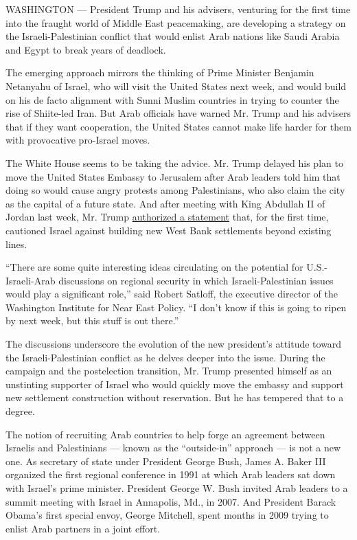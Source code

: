 WASHINGTON --- President Trump and his advisers, venturing for the first
time into the fraught world of Middle East peacemaking, are developing a
strategy on the Israeli-Palestinian conflict that would enlist Arab
nations like Saudi Arabia and Egypt to break years of deadlock.

The emerging approach mirrors the thinking of Prime Minister Benjamin
Netanyahu of Israel, who will visit the United States next week, and
would build on his de facto alignment with Sunni Muslim countries in
trying to counter the rise of Shiite-led Iran. But Arab officials have
warned Mr. Trump and his advisers that if they want cooperation, the
United States cannot make life harder for them with provocative
pro-Israel moves.

The White House seems to be taking the advice. Mr. Trump delayed his
plan to move the United States Embassy to Jerusalem after Arab leaders
told him that doing so would cause angry protests among Palestinians,
who also claim the city as the capital of a future state. And after
meeting with King Abdullah II of Jordan last week, Mr. Trump
\href{https://www.nytimes3xbfgragh.onion/2017/02/02/world/middleeast/iran-missile-test-trump.html}{authorized
a statement} that, for the first time, cautioned Israel against building
new West Bank settlements beyond existing lines.

``There are some quite interesting ideas circulating on the potential
for U.S.-Israeli-Arab discussions on regional security in which
Israeli-Palestinian issues would play a significant role,'' said Robert
Satloff, the executive director of the Washington Institute for Near
East Policy. ``I don't know if this is going to ripen by next week, but
this stuff is out there.''

The discussions underscore the evolution of the new president's attitude
toward the Israeli-Palestinian conflict as he delves deeper into the
issue. During the campaign and the postelection transition, Mr. Trump
presented himself as an unstinting supporter of Israel who would quickly
move the embassy and support new settlement construction without
reservation. But he has tempered that to a degree.

The notion of recruiting Arab countries to help forge an agreement
between Israelis and Palestinians --- known as the ``outside-in''
approach --- is not a new one. As secretary of state under President
George Bush, James A. Baker III organized the first regional conference
in 1991 at which Arab leaders sat down with Israel's prime minister.
President George W. Bush invited Arab leaders to a summit meeting with
Israel in Annapolis, Md., in 2007. And President Barack Obama's first
special envoy, George Mitchell, spent months in 2009 trying to enlist
Arab partners in a joint effort.

